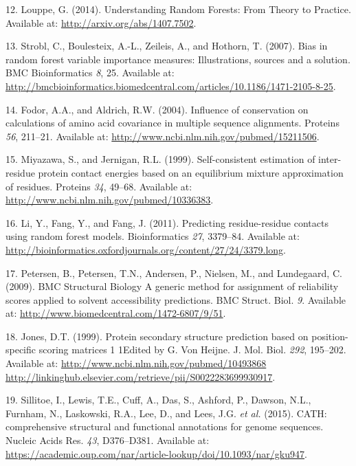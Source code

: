 \documentclass[12pt,a4paper,twoside]{book}
\theoremstyle{definition}
\theoremstyle{definition}
\theoremstyle{remark}
\begin{document}
\hypertarget{ref-Louppe2014}{}
12. Louppe, G. (2014). Understanding Random Forests: From Theory to
Practice. Available at: \url{http://arxiv.org/abs/1407.7502}.

\hypertarget{ref-Strobl2007}{}
13. Strobl, C., Boulesteix, A.-L., Zeileis, A., and Hothorn, T. (2007).
Bias in random forest variable importance measures: Illustrations,
sources and a solution. BMC Bioinformatics \emph{8}, 25. Available at:
\url{http://bmcbioinformatics.biomedcentral.com/articles/10.1186/1471-2105-8-25}.

\hypertarget{ref-Fodor2004a}{}
14. Fodor, A.A., and Aldrich, R.W. (2004). Influence of conservation on
calculations of amino acid covariance in multiple sequence alignments.
Proteins \emph{56}, 211--21. Available at:
\url{http://www.ncbi.nlm.nih.gov/pubmed/15211506}.

\hypertarget{ref-Miyazawa1999a}{}
15. Miyazawa, S., and Jernigan, R.L. (1999). Self-consistent estimation
of inter-residue protein contact energies based on an equilibrium
mixture approximation of residues. Proteins \emph{34}, 49--68. Available
at: \url{http://www.ncbi.nlm.nih.gov/pubmed/10336383}.

\hypertarget{ref-Li2011}{}
16. Li, Y., Fang, Y., and Fang, J. (2011). Predicting residue-residue
contacts using random forest models. Bioinformatics \emph{27}, 3379--84.
Available at:
\url{http://bioinformatics.oxfordjournals.org/content/27/24/3379.long}.

\hypertarget{ref-Petersen2009a}{}
17. Petersen, B., Petersen, T.N., Andersen, P., Nielsen, M., and
Lundegaard, C. (2009). BMC Structural Biology A generic method for
assignment of reliability scores applied to solvent accessibility
predictions. BMC Struct. Biol. \emph{9}. Available at:
\url{http://www.biomedcentral.com/1472-6807/9/51}.

\hypertarget{ref-Jones1999}{}
18. Jones, D.T. (1999). Protein secondary structure prediction based on
position-specific scoring matrices 1 1Edited by G. Von Heijne. J. Mol.
Biol. \emph{292}, 195--202. Available at:
\href{http://www.ncbi.nlm.nih.gov/pubmed/10493868\%20http://linkinghub.elsevier.com/retrieve/pii/S0022283699930917}{http://www.ncbi.nlm.nih.gov/pubmed/10493868 http://linkinghub.elsevier.com/retrieve/pii/S0022283699930917}.

\hypertarget{ref-Sillitoe2015}{}
19. Sillitoe, I., Lewis, T.E., Cuff, A., Das, S., Ashford, P., Dawson,
N.L., Furnham, N., Laskowski, R.A., Lee, D., and Lees, J.G. \emph{et
al.} (2015). CATH: comprehensive structural and functional annotations
for genome sequences. Nucleic Acids Res. \emph{43}, D376--D381.
Available at:
\url{https://academic.oup.com/nar/article-lookup/doi/10.1093/nar/gku947}.
\end{document}
